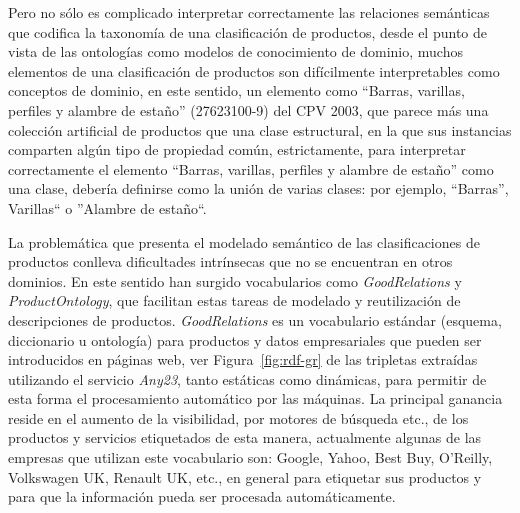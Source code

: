 Pero no sólo es complicado interpretar correctamente las relaciones semánticas
que codifica la taxonomía de una clasificación de productos, desde el punto de vista de las ontologías
como modelos de conocimiento de dominio, muchos elementos de una clasificación de productos son
difícilmente interpretables como conceptos de dominio, en este sentido, un elemento como ``Barras, varillas, perfiles y alambre de
estaño'' (27623100-9) del CPV 2003, que parece más una colección
artificial de productos que una clase estructural, en la que sus instancias
comparten algún tipo de propiedad común, estrictamente, para
interpretar correctamente el elemento ``Barras, varillas, perfiles y alambre de
estaño'' como una clase, debería definirse como la unión de varias clases:
por ejemplo, ``Barras'', Varillas`` o ''Alambre de estaño``.

La problemática que presenta el modelado semántico de las clasificaciones de productos
conlleva dificultades intrínsecas que no se encuentran en otros dominios. En este
sentido han surgido vocabularios como \textit{GoodRelations} y \textit{ProductOntology}, que facilitan
estas tareas de modelado y reutilización de descripciones de productos. \textit{GoodRelations}
es un vocabulario estándar (esquema, diccionario u ontología) para productos y datos empresariales 
que pueden ser introducidos en páginas web, ver Figura~\ref{fig:rdf-gr} de las tripletas
extraídas utilizando el servicio \textit{Any23}, tanto estáticas como dinámicas, para permitir de esta forma el procesamiento automático por las máquinas. La principal ganancia
reside en el aumento de la visibilidad, por motores de búsqueda etc., de los productos y servicios 
etiquetados de esta manera, actualmente algunas de las empresas que utilizan este vocabulario
son: Google, Yahoo, Best Buy, O'Reilly, Volkswagen UK, Renault UK, etc., en general para etiquetar
sus productos y para que la información pueda ser procesada automáticamente.


